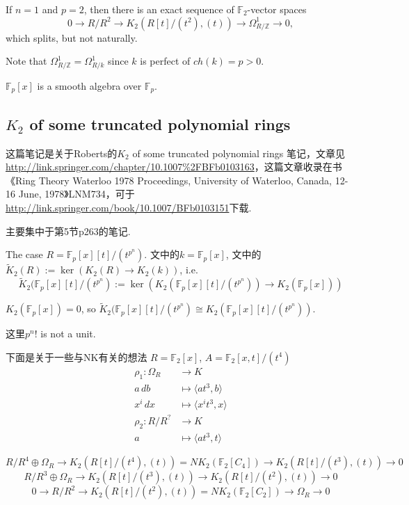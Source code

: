 If $n = 1$ and $p = 2$, then there is an exact sequence of $\mathbb{F}_2$-vector spaces
\[0 \longrightarrow R/R^2 \longrightarrow K_2 (R[t]/(t^2 ),(t)) \longrightarrow \Omega^1_{R/\mathbb{Z}} \longrightarrow 0,\]
which splits, but not naturally.

Note that $\Omega^1_{R/\mathbb{Z}} = \Omega^1_{R/k}$
since $k$ is perfect of $ch(k)=p  > 0$.

$\mathbb{F}_{p}[x]$ is a smooth algebra over $\mathbb{F}_{p}$.

\subsection{$K_2$ of some truncated polynomial rings}
这篇笔记是关于Roberts的$K_2$ of some truncated polynomial rings\cite{MR80k:13005} 笔记，文章见\url{http://link.springer.com/chapter/10.1007%2FBFb0103163}，这篇文章收录在书《Ring Theory Waterloo 1978 Proceedings, University of Waterloo, Canada, 12-16 June, 1978》LNM734，可于\url{http://link.springer.com/book/10.1007/BFb0103151}下载.

主要集中于第5节p263的笔记.

The case $R=\mathbb{F}_p[x][t]/(t^{p^n})$. 文中的$k=\mathbb{F}_p[x]$,
文中的$\tilde{K}_2(R):= \ker(K_2(R)\rightarrow K_2(k))$, i.e. 
\[\tilde{K}_2(\mathbb{F}_p[x][t]/(t^{p^n}):= \ker(K_2(\mathbb{F}_p[x][t]/(t^{p^n}))\rightarrow K_2(\mathbb{F}_p[x]))\]

$K_2(\mathbb{F}_p[x])=0$, so $\tilde{K}_2(\mathbb{F}_p[x][t]/(t^{p^n}) \cong K_2(\mathbb{F}_p[x][t]/(t^{p^n}))$.

这里$p^n!$ is not a unit.

下面是关于一些与NK有关的想法
$R=\mathbb{F}_2[x]$, $A=\mathbb{F}_2[x,t]/(t^4)$
\begin{align*}
\rho_1 \colon \Omega_R &\longrightarrow K \\
		a\,db & \mapsto \langle at^3,b \rangle \\
		x^i\,dx & \mapsto \langle x^it^3,x \rangle \\
\rho_2 \colon R/R^? &\longrightarrow K \\
		a & \mapsto \langle at^3,t \rangle
\end{align*}

\[R/R^4\oplus \Omega_R \longrightarrow K_2(R[t]/(t^4),(t))=NK_2(\mathbb{F}_2[C_4]) \longrightarrow K_2(R[t]/(t^3),(t))\longrightarrow 0\]
\[R/R^3\oplus \Omega_R \longrightarrow K_2(R[t]/(t^3),(t)) \longrightarrow K_2(R[t]/(t^2),(t))\longrightarrow 0\]
\[0\longrightarrow R/R^2  \longrightarrow K_2(R[t]/(t^2),(t))=NK_2(\mathbb{F}_2[C_2]) \longrightarrow \Omega_R \longrightarrow 0\]

